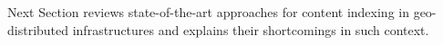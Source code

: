 Next Section reviews state-of-the-art approaches for content indexing
in geo-distributed infrastructures and explains their shortcomings in
such context.



